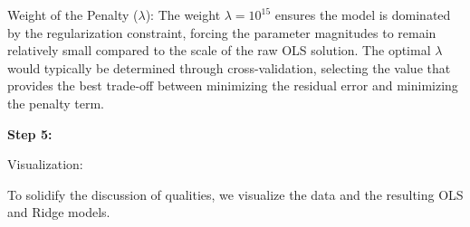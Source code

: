 Weight of the Penalty (\(\lambda\)): The weight \(\lambda = 10^{15}\)
ensures the model is dominated by the regularization constraint, forcing
the parameter magnitudes to remain relatively small compared to the
scale of the raw OLS solution. The optimal \(\lambda\) would typically
be determined through cross-validation, selecting the value that
provides the best trade-off between minimizing the residual error and
minimizing the penalty term.

\leavevmode{}%
\textbf{Step 5:}

Visualization:

To solidify the discussion of qualities, we visualize the data and the
resulting OLS and Ridge models.

\hypertarget{0444cb00}{}
\begin{Shaded}
\begin{Highlighting}[]
\OperatorTok{=}\OperatorTok{{-}} \NormalTok{, }\OperatorTok{+} \NormalTok{, }\OperatorTok{{-}}\NormalTok{, }\NormalTok{)}
\OperatorTok{=}

\OperatorTok{=}
\OperatorTok{=}

\OperatorTok{=}\NormalTok{(}\NormalTok{, }\NormalTok{))}

\OperatorTok{=}\OperatorTok{=}\OperatorTok{=}\NormalTok{)}

\OperatorTok{=}\OperatorTok{=}\StringTok{\textquotesingle{}{-}{-}\textquotesingle{}}\NormalTok{,}
\OperatorTok{=}\OperatorTok{=}\NormalTok{)}


\end{Highlighting}
\end{Shaded}
